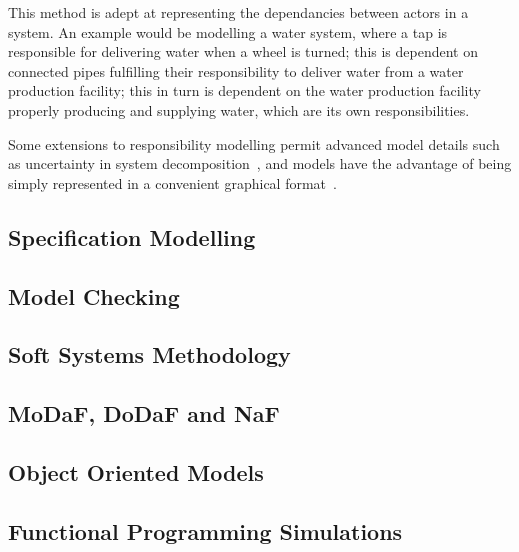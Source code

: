 \documentclass[draft,12pt]{article}
\begin{document}
This method is adept at representing the dependancies between actors in a
system. An example would be modelling a water system, where a tap is responsible
for delivering water when a wheel is turned; this is dependent on connected
pipes fulfilling their responsibility to deliver water from a water production
facility; this in turn is dependent on the water production facility properly
producing and supplying water, which are its own responsibilities.
\par

Some extensions to responsibility modelling permit advanced model details such
as uncertainty in system decomposition~\cite{simpson2017formalised}, and models
have the advantage of being simply represented in a convenient graphical
format~\cite{storer2008modelling}.

\subsection{Specification Modelling}


\subsection{Model Checking}


\subsection{Soft Systems Methodology}




\subsection{MoDaF, DoDaF and NaF}


\subsection{Object Oriented Models}


\subsection{Functional Programming Simulations}
\end{document}
